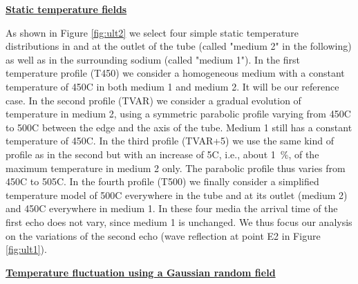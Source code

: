             \underline{\textbf{Static temperature fields}}

                As shown in Figure \ref{fig:ult2} we select four simple static temperature distributions in and at the outlet of the tube (called "medium 2" in
the following) as well as in the surrounding sodium (called "medium 1"). In the first temperature profile (T450) we consider a homogeneous medium with a
constant temperature of 450\textdegree{}C in both medium 1 and medium 2. It will be our reference case. In the second profile (TVAR) we consider a gradual
evolution of temperature in medium 2, using a symmetric parabolic profile varying from 450\textdegree{}C to 500\textdegree{}C between the edge and the axis of
the tube. Medium 1 still has a constant temperature of 450\textdegree{}C. In the third profile (TVAR+5) we use the same kind of profile as in the second but
with an increase of 5\textdegree{}C, i.e., about \SI{1}{\percent}, of the maximum temperature in medium 2 only. The parabolic profile thus varies from
450\textdegree{}C to 505\textdegree{}C. In the fourth profile (T500) we finally consider a simplified temperature model of 500\textdegree{}C everywhere in the
tube and at its outlet (medium 2) and 450\textdegree{}C everywhere in medium 1.
                In these four media the arrival time of the first echo does not vary, since medium 1 is unchanged. We thus focus our analysis on the variations
of the second echo (wave reflection at point E2 in Figure \ref{fig:ult1}).

            \underline{\textbf{Temperature fluctuation using a Gaussian random field}}

